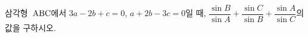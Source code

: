 삼각형~$\mathrm{ABC}$에서 $3a-2b+c=0$, $a+2b-3c=0$일 때, $\dfrac{\sin B}{\sin A}+\dfrac{\sin C}{\sin B}+\dfrac{\sin A}{\sin C}$의 값을 구하시오.
